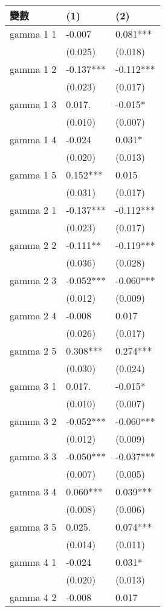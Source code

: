 \begin{tabular}{lll}
  \hline
變數 & (1) & (2) \\ 
  \hline
gamma 1 1 & -0.007 & 0.081*** \\ 
   & (0.025) & (0.018) \\ 
  gamma 1 2 & -0.137*** & -0.112*** \\ 
   & (0.023) & (0.017) \\ 
  gamma 1 3 & 0.017. & -0.015* \\ 
   & (0.010) & (0.007) \\ 
  gamma 1 4 & -0.024 & 0.031* \\ 
   & (0.020) & (0.013) \\ 
  gamma 1 5 & 0.152*** & 0.015 \\ 
   & (0.031) & (0.017) \\ 
  gamma 2 1 & -0.137*** & -0.112*** \\ 
   & (0.023) & (0.017) \\ 
  gamma 2 2 & -0.111** & -0.119*** \\ 
   & (0.036) & (0.028) \\ 
  gamma 2 3 & -0.052*** & -0.060*** \\ 
   & (0.012) & (0.009) \\ 
  gamma 2 4 & -0.008 & 0.017 \\ 
   & (0.026) & (0.017) \\ 
  gamma 2 5 & 0.308*** & 0.274*** \\ 
   & (0.030) & (0.024) \\ 
  gamma 3 1 & 0.017. & -0.015* \\ 
   & (0.010) & (0.007) \\ 
  gamma 3 2 & -0.052*** & -0.060*** \\ 
   & (0.012) & (0.009) \\ 
  gamma 3 3 & -0.050*** & -0.037*** \\ 
   & (0.007) & (0.005) \\ 
  gamma 3 4 & 0.060*** & 0.039*** \\ 
   & (0.008) & (0.006) \\ 
  gamma 3 5 & 0.025. & 0.074*** \\ 
   & (0.014) & (0.011) \\ 
  gamma 4 1 & -0.024 & 0.031* \\ 
   & (0.020) & (0.013) \\ 
  gamma 4 2 & -0.008 & 0.017 \\ 

\end{tabular}
